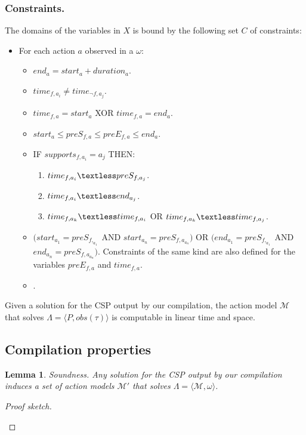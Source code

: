 \documentclass[letterpaper]{article} %
\newcommand{\tup}[1]{{\langle #1 \rangle}}
\newtheorem{lemma}[theorem]{Lemma}
\begin{document}
\subsubsection{Constraints.} The domains of the variables in $X$ is bound by the following set $C$ of constraints:
\begin{itemize}
\item For each action $a$ observed in a $\omega$:
\begin{itemize}
\item $end_a = start_a + duration_a$.
\item $time_{f,a_i}\neq time_{\neg f,a_j}$.
\item $time_{f,a}= start_a$ XOR $time_{f,a}= end_a$.
\item $start_a\leq preS_{f,a}\leq preE_{f,a}\leq end_a$.
\item IF $supports_{f,a_i}=a_j$ THEN:
\begin{enumerate}
\item $time_{f,a_i}\textless  preS_{f,a_j}$.
\item $time_{f,a_i}\textless  end_{a_j}$.
\item $time_{f,a_k}\textless time_{f,a_i}$ OR $time_{f,a_k}\textless time_{f,a_j}$.
\end{enumerate}
\item $(start_{a_1} = preS_{f,_{a_1}}$ AND $start_{a_n} = preS_{f,a_{a_n}})$ OR $(end_{a_1} = preS_{f,_{a_1}}$ AND $end_{a_n} = preS_{f,a_{a_n}})$. Constraints of the same kind are also defined for the variables $preE_{f,a}$ and $time_{f,a}$.
\item .
\end{itemize}
\end{itemize}

Given a solution for the CSP output by our compilation, the action model $\mathcal{M}$ that solves $\Lambda=\tup{P,obs(\tau)}$ is computable in linear time and space.


\subsection{Compilation properties}
\begin{lemma}
Soundness. Any solution for the CSP output by our compilation induces a set of action models $\mathcal{M}'$ that solves $\Lambda=\tup{\mathcal{M},\omega}$.
\end{lemma}

\begin{proof}[Proof sketch]
\begin{small}
\end{small}
\end{proof}
\end{document}
